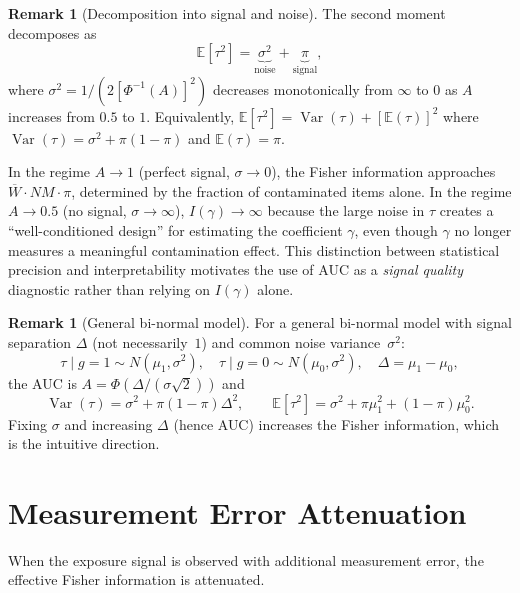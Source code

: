 \documentclass[11pt,a4paper]{article}
\theoremstyle{definition}
\newtheorem{remark}[theorem]{Remark}
\DeclareMathOperator{\Var}{Var}
\begin{document}
\begin{remark}[Decomposition into signal and noise]\label{rem:decomp}
The second moment decomposes as
\[
  \mathbb{E}[\tau^2]
  = \underbrace{\sigma^2}_{\text{noise}}
  + \underbrace{\pi}_{\text{signal}}\!,
\]
where $\sigma^2 = 1/(2[\Phi^{-1}(A)]^2)$ decreases monotonically
from $\infty$ to $0$ as $A$ increases from $0.5$ to $1$.
Equivalently,
$\mathbb{E}[\tau^2] = \Var(\tau) + [\mathbb{E}(\tau)]^2$
where $\Var(\tau)=\sigma^2+\pi(1{-}\pi)$ and $\mathbb{E}(\tau)=\pi$.

In the regime $A\to 1$ (perfect signal, $\sigma\to 0$),
the Fisher information approaches $\overline{W}\cdot NM\cdot\pi$,
determined by the fraction of contaminated items alone.
In the regime $A\to 0.5$ (no signal, $\sigma\to\infty$),
$I(\gamma)\to\infty$ because the large noise in $\tau$ creates a
``well-conditioned design'' for estimating the coefficient $\gamma$,
even though $\gamma$ no longer measures a meaningful contamination effect.
This distinction between statistical precision and interpretability
motivates the use of AUC as a \emph{signal quality} diagnostic
rather than relying on $I(\gamma)$ alone.
\end{remark}


\begin{remark}[General bi-normal model]\label{rem:general_binormal}
For a general bi-normal model with signal separation $\Delta$
(not necessarily~$1$) and common noise variance~$\sigma^2$:
\[
  \tau\mid g{=}1 \sim N(\mu_1,\sigma^2),\quad
  \tau\mid g{=}0 \sim N(\mu_0,\sigma^2),\quad
  \Delta = \mu_1-\mu_0,
\]
the AUC is $A=\Phi(\Delta/(\sigma\sqrt{2}))$ and
\[
  \Var(\tau) = \sigma^2 + \pi(1{-}\pi)\Delta^2,
  \qquad
  \mathbb{E}[\tau^2] = \sigma^2 + \pi\mu_1^2 + (1{-}\pi)\mu_0^2.
\]
Fixing $\sigma$ and increasing $\Delta$ (hence AUC) increases the Fisher
information, which is the intuitive direction.
\end{remark}


\section{Measurement Error Attenuation}\label{sec:me}

When the exposure signal is observed with additional measurement error,
the effective Fisher information is attenuated.
\end{document}
